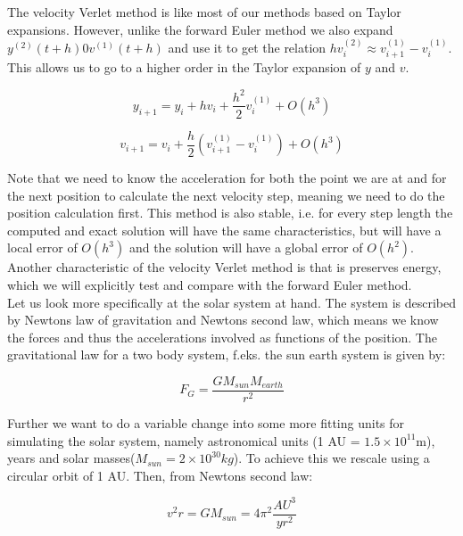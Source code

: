 \documentclass[a4paper,11pt]{article}
\begin{document}
{The velocity Verlet method is like most of our methods based on Taylor expansions. However, unlike the forward Euler method we also expand $y^{(2)}(t+h) 0 v^{(1)}(t+h)$ and use it to get the relation $h v_i^{(2)} \approx v_{i+1}^{(1)} - v_i^{(1)}$. This allows us to go to a higher order in the Taylor expansion of $y$ and $v$.

\begin{equation}
y_{i+1} = y_i + h v_{i} + \frac{h^2}{2} v^{(1)}_{i} + O(h^3)	
\label{Verlet}
\end{equation}

\begin{equation*}
v_{i+1} = v_i + \frac{h}{2}\left(v_{i+1}^{(1)} - v_i^{(1)}\right)  + O(h^3)
\end{equation*}

Note that we need to know the acceleration for both the point we are at and for the next position to calculate the next velocity step, meaning we need to do the position calculation first. This method is also stable, i.e. for every step length the computed and exact solution will have the same characteristics, but will have a local error of $O(h^3)$ and the solution will have a global error of $O(h^2)$. Another characteristic of the velocity Verlet method is that is preserves energy, which we will explicitly test and compare with the forward Euler method. \\

Let us look more specifically at the solar system at hand. The system is described by Newtons law of gravitation and Newtons second law, which means we know the forces and thus the accelerations involved as functions of the position. The gravitational law for a two body system, f.eks. the sun earth system is given by:

\begin{equation}
F_G = \frac{G M_{sun} M_{earth}}{r^2}
\label{2bodygrav}
\end{equation}

Further we want to do a variable change into some more fitting units for simulating the solar system, namely astronomical units (1 AU = $1.5 \times 10^{11}$m), years and solar masses($M_{sun} = 2\times 10^{30} kg$). To achieve this we rescale using a circular orbit of 1 AU. Then, from Newtons second law:

\begin{equation}
v^2 r = G M_{sun} = 4 \pi^2 \frac{AU^3}{yr^2}
\label{circorbi}
\end{equation}

}
\end{document}
